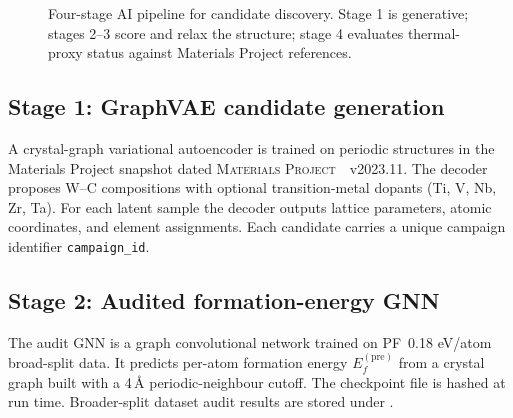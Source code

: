 \documentclass[11pt,a4paper]{article}
\begin{document}
\begin{figure}[ht]
\centering
{}
\caption{Four-stage AI pipeline for candidate discovery.
Stage 1 is generative; stages 2--3 score and relax the structure;
stage 4 evaluates thermal-proxy status against Materials Project
references.}
\label{fig:pipeline}
\end{figure}

\subsection{Stage 1: GraphVAE candidate generation}
\label{sec:m1}

A crystal-graph variational autoencoder is trained on periodic
structures in the Materials Project snapshot dated
\textsc{Materials Project}~~v2023.11. The decoder proposes W--C
compositions with optional transition-metal dopants (Ti, V, Nb, Zr, Ta).
For each latent sample the decoder outputs lattice parameters,
atomic coordinates, and element assignments. Each candidate carries a
unique campaign identifier \texttt{campaign\_id}.

\subsection{Stage 2: Audited formation-energy GNN}
\label{sec:m2}

The audit GNN is a graph convolutional network trained on
PF~0.18 eV/atom broad-split data. It predicts per-atom formation
energy $E_f^{(\mathrm{pre})}$ from a crystal graph built with a 4\,Å
periodic-neighbour cutoff. The checkpoint file
 is hashed at run
time. Broader-split dataset audit results are stored under
.
\end{document}
